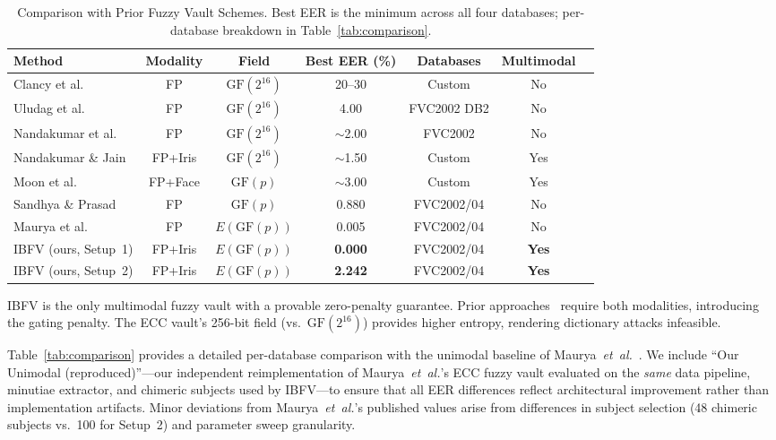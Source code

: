 \documentclass[3p,twocolumn]{elsarticle}
\newcommand{\IBFV}{\textsf{IBFV}}
\newcommand{\GFp}{\mathrm{GF}(p)}
\begin{document}
\begin{table}[t]
\centering
\caption{Comparison with Prior Fuzzy Vault Schemes. Best EER is the minimum across all four databases; per-database breakdown in Table~\ref{tab:comparison}.}
\label{tab:comparison_extended}
\begin{tabular}{@{}l c c c c c c@{}}
\toprule
\textbf{Method} & \textbf{Modality} & \textbf{Field} & \textbf{Best EER (\%)} & \textbf{Databases} & \textbf{Multimodal}\\
\midrule
Clancy et al.~\cite{clancy2003secure} & FP & $\text{GF}(2^{16})$ & 20--30 & Custom & No\\
Uludag et al.~\cite{uludag2005fuzzy} & FP & $\text{GF}(2^{16})$ & 4.00 & FVC2002 DB2 & No\\
Nandakumar et al.~\cite{nandakumar2007fuzzy} & FP & $\text{GF}(2^{16})$ & $\sim$2.00 & FVC2002 & No\\
Nandakumar \& Jain~\cite{nandakumar2008multibiometric} & FP+Iris & $\text{GF}(2^{16})$ & $\sim$1.50 & Custom & Yes \\
Moon et al.~\cite{moon2010multibiometric} & FP+Face & $\text{GF}(p)$ & $\sim$3.00 & Custom & Yes\\
Sandhya \& Prasad~\cite{sandhya2017fingerprint} & FP & $\text{GF}(p)$ & 0.880 & FVC2002/04 & No\\
Maurya et al.~\cite{maurya2025enhancing} & FP & $E(\GFp{})$ & 0.005 & FVC2002/04 & No\\
\midrule
\IBFV{} (ours, Setup~1) & FP+Iris & $E(\GFp{})$ & \textbf{0.000} & FVC2002/04 & \textbf{Yes}\\
\IBFV{} (ours, Setup~2) & FP+Iris & $E(\GFp{})$ & \textbf{2.242} & FVC2002/04 & \textbf{Yes}\\
\bottomrule
\end{tabular}
\end{table}

\IBFV{} is the only multimodal fuzzy vault with a provable zero-penalty guarantee. Prior approaches~\cite{nandakumar2008multibiometric,moon2010multibiometric} require both modalities, introducing the gating penalty. The ECC vault's 256-bit field (vs.\ $\text{GF}(2^{16})$) provides higher entropy, rendering dictionary attacks infeasible.

Table~\ref{tab:comparison} provides a detailed per-database comparison with the unimodal baseline of Maurya~\textit{et~al.}~\cite{maurya2025enhancing}. We include ``Our Unimodal (reproduced)''---our independent reimplementation of Maurya~\textit{et~al.}'s ECC fuzzy vault evaluated on the \emph{same} data pipeline, minutiae extractor, and chimeric subjects used by \IBFV{}---to ensure that all EER differences reflect architectural improvement rather than implementation artifacts. Minor deviations from Maurya~\textit{et~al.}'s published values arise from differences in subject selection (48 chimeric subjects vs.\ 100 for Setup~2) and parameter sweep granularity.
\end{document}
